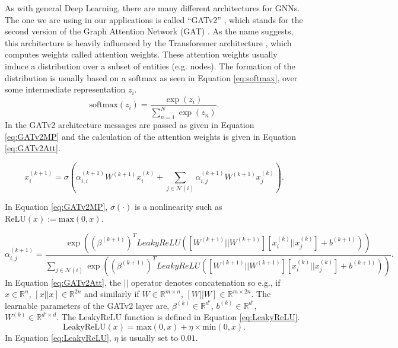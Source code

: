 \documentclass{report}
\newcommand{\reals}{\mbox{\(\mathbb R\)}}
\numberwithin{equation}{section}
\numberwithin{figure}{section}
\numberwithin{table}{section}
\numberwithin{algorithm}{section}
\begin{document}
As with general Deep Learning, there are many different architectures 
for GNNs. The one we are using in our applications is called ``GATv2'' 
\citep{GATv2}, 
which stands for the second version of the Graph Attention Network 
(GAT) \citep{GAT}. As the name suggests, 
this architecture is heavily influenced by the Transforemer 
architecture \citep{transformers}, which computes weights called 
attention weights. These attention weights 
usually induce a distribution over a subset of entities (e.g. nodes). 
The formation of the distribution is usually based on 
a softmax as seen in Equation \ref{eq:softmax}, over some 
intermediate representation $z_i$.
\begin{equation}\label{eq:softmax}
  \text{softmax}(z_i) = \frac{\exp(z_i)}{\sum_{n=1}^N \exp(z_n)}.
\end{equation}
In the GATv2 architecture messages are passed as given in 
Equation \ref{eq:GATv2MP} and the calculation of the attention 
weights is given in Equation \ref{eq:GATv2Att}.

\begin{equation}\label{eq:GATv2MP}
  x_i^{(k+1)}=\sigma(\alpha_{i,i}^{(k+1)}W^{(k+1)}x_i^{(k)} 
  + \sum_{j\in\mathcal{N}(i)}\alpha^{(k+1)}_{i,j}W^{(k+1)}x_j^{(k)}).
\end{equation}

In Equation \ref{eq:GATv2MP}, $\sigma(\cdot)$ is a 
nonlinearity such as 
$\text{ReLU}(x):=\text{max}(0, x)$.

\begin{equation}\label{eq:GATv2Att}
  \alpha_{i,j}^{(k+1)}=\frac{
    \exp((\beta^{(k+1)})^TLeakyReLU([W^{(k+1)}||W^{(k+1)}] [x_i^{(k)}||x_j^{(k)}] + b^{(k+1)}))
  }{\sum_{j\in\mathcal{N}(i)}\exp((\beta^{(k+1)})^TLeakyReLU([W^{(k+1)}||W^{(k+1)}] [x_i^{(k)}||x_j^{(k)}] + b^{(k+1)}))}.
\end{equation}
In Equation \ref{eq:GATv2Att}, the $||$ operator denotes concatenation 
so e.g., if $x\in\reals^{n}$, $[x||x]\in\reals^{2n}$ and similarly 
if $W\in\reals^{m\times n}$, $[W||W]\in\reals^{m\times 2n}$.
The learnable parameters of the GATv2 layer are, $\beta^{(k)}\in\reals^{d'}$, 
$b^{(k)}\in\reals^{d'}$, $W^{(k)}\in\reals^{d'\times d}$. 
The $\text{LeakyReLU}$ function is defined in 
Equation \ref{eq:LeakyReLU}.
\begin{equation}\label{eq:LeakyReLU}
  \text{LeakyReLU}(x)=\text{max}(0,x) + \eta\times \text{min}(0,x).
\end{equation}
In Equation \ref{eq:LeakyReLU}, $\eta$ is usually set to $0.01$.
\end{document}
